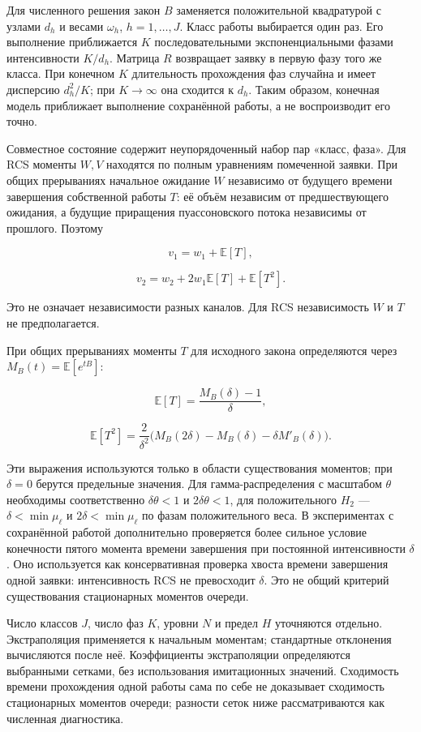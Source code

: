 Для численного решения закон \(B\) заменяется положительной квадратурой с узлами \(d_h\) и весами \(\omega_h\), \(h=1,\ldots,J\). Класс работы выбирается один раз. Его выполнение приближается \(K\) последовательными экспоненциальными фазами интенсивности \(K/d_h\). Матрица \(R\) возвращает заявку в первую фазу того же класса. При конечном \(K\) длительность прохождения фаз случайна и имеет дисперсию \(d_h^2/K\); при \(K\to\infty\) она сходится к \(d_h\). Таким образом, конечная модель приближает выполнение сохранённой работы, а не воспроизводит его точно.

Совместное состояние содержит неупорядоченный набор пар «класс, фаза». Для RCS моменты \(W,V\) находятся по полным уравнениям помеченной заявки. При общих прерываниях начальное ожидание \(W\) независимо от будущего времени завершения собственной работы \(T\): её объём независим от предшествующего ожидания, а будущие приращения пуассоновского потока независимы от прошлого. Поэтому


\[v_1=w_1+\mathbb E[T],\]

\[v_2=w_2+2w_1\mathbb E[T]+\mathbb E[T^2].\]


Это не означает независимости разных каналов. Для RCS независимость \(W\) и \(T\) не предполагается.

При общих прерываниях моменты \(T\) для исходного закона определяются через \(M_B(t)=\mathbb E[e^{tB}]\):


\[\mathbb E[T]=\frac{M_B(\delta)-1}{\delta},\]

\[\mathbb E[T^2]=\frac{2}{\delta^2}\bigl(M_B(2\delta)-M_B(\delta)-\delta M'_B(\delta)\bigr).\]


Эти выражения используются только в области существования моментов; при \(\delta=0\) берутся предельные значения. Для гамма-распределения с масштабом \(\theta\) необходимы соответственно \(\delta\theta<1\) и \(2\delta\theta<1\), для положительного \(H_2\) --- \(\delta<\min\mu_\ell\) и \(2\delta<\min\mu_\ell\) по фазам положительного веса. В экспериментах с сохранённой работой дополнительно проверяется более сильное условие конечности пятого момента времени завершения при постоянной интенсивности \(\delta\). Оно используется как консервативная проверка хвоста времени завершения одной заявки: интенсивность RCS не превосходит \(\delta\). Это не общий критерий существования стационарных моментов очереди.

Число классов \(J\), число фаз \(K\), уровни \(N\) и предел \(H\) уточняются отдельно. Экстраполяция применяется к начальным моментам; стандартные отклонения вычисляются после неё. Коэффициенты экстраполяции определяются выбранными сетками, без использования имитационных значений. Сходимость времени прохождения одной работы сама по себе не доказывает сходимость стационарных моментов очереди; разности сеток ниже рассматриваются как численная диагностика.

